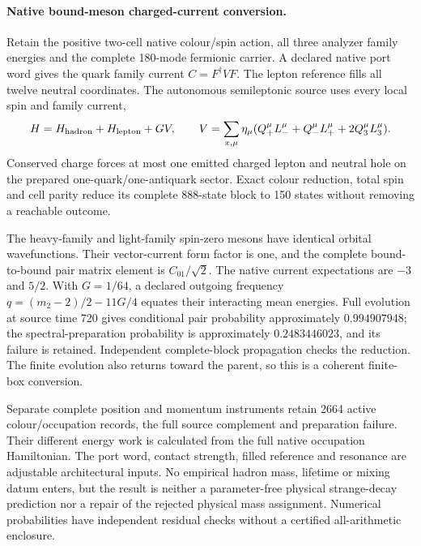 \paragraph{Native bound-meson charged-current conversion.}
Retain the positive two-cell native colour/spin action, all three analyzer
family energies and the complete 180-mode fermionic carrier. A declared
native port word gives the quark family current $C=F^\dagger VF$.
The lepton reference fills all twelve neutral coordinates. The autonomous
semileptonic source uses every local spin and family current,
\[
 H=H_{\rm hadron}+H_{\rm lepton}+GV,\qquad
 V=\sum_{x,\mu}\eta_\mu
 (Q_+^\mu L_-^\mu+Q_-^\mu L_+^\mu+2Q_3^\mu L_3^\mu).
\]
Conserved charge forces at most one emitted charged lepton and neutral hole
on the prepared one-quark/one-antiquark sector. Exact colour reduction,
total spin and cell parity reduce its complete 888-state block to 150
states without removing a reachable outcome.

The heavy-family and light-family spin-zero mesons have identical orbital
wavefunctions. Their vector-current form factor is one, and the complete
bound-to-bound pair matrix element is $C_{01}/\sqrt2$. The native current
expectations are $-3$ and $5/2$. With $G=1/64$, a declared outgoing frequency
$q=(m_2-2)/2-11G/4$ equates their interacting mean energies. Full evolution
at source time 720 gives conditional pair probability approximately
$0.994907948$; the spectral-preparation probability is approximately
$0.2483446023$, and its failure is retained. Independent complete-block
propagation checks the reduction. The finite evolution also returns toward
the parent, so this is a coherent finite-box conversion.

Separate complete position and momentum instruments retain 2664 active
colour/occupation records, the full source complement and preparation
failure. Their different energy work is calculated from the full native
occupation Hamiltonian. The port word, contact strength, filled reference
and resonance are adjustable architectural inputs. No empirical hadron
mass, lifetime or mixing datum enters, but the result is neither a
parameter-free physical strange-decay prediction nor a repair of the
rejected physical mass assignment. Numerical probabilities have independent
residual checks without a certified all-arithmetic enclosure.
